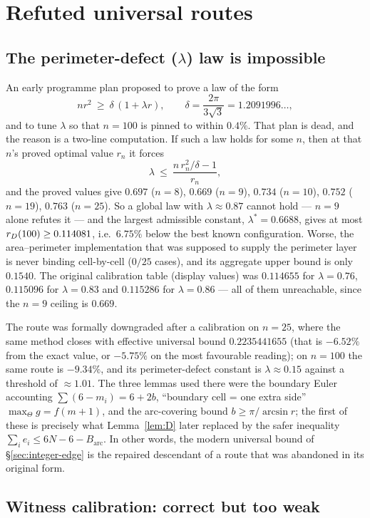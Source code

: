 \section{Refuted universal routes}

\subsection{The perimeter-defect ($\lambda$) law is impossible}

An early programme plan proposed to prove a law of the form
\[
n r^2\ \ge\ \delta\,(1+\lambda r),\qquad \delta=\frac{2\pi}{3\sqrt3}=1.2091996\ldots,
\]
and to tune $\lambda$ so that $n=100$ is pinned to within $0.4\%$. That plan is dead, and the
reason is a two-line computation. If such a law holds for some $n$, then at that $n$'s proved
optimal value $r_n$ it forces
\[
\lambda\ \le\ \frac{n\,r_n^2/\delta-1}{r_n},
\]
and the proved values give $0.697$ ($n=8$), $\mathbf{0.669}$ ($n=9$), $0.734$ ($n=10$), $0.752$
($n=19$), $0.763$ ($n=25$). So a global law with $\lambda\approx0.87$ cannot hold --- $n=9$ alone
refutes it --- and the largest admissible constant, $\lambda^\ast=0.6688$, gives at most
$r_{D}(100)\ge0.114081$, i.e.\ $6.75\%$ below the best known configuration. Worse, the
area--perimeter implementation that was supposed to supply the perimeter layer is never binding
cell-by-cell ($0/25$ cases), and its aggregate upper bound is only $0.1540$. The original
calibration table (display values) was $0.114655$ for $\lambda=0.76$, $0.115096$ for $\lambda=0.83$
and $0.115286$ for $\lambda=0.86$ --- all of them unreachable, since the $n=9$ ceiling is
$0.669$.

The route was formally downgraded after a calibration on $n=25$, where the same method closes with
effective universal bound $0.2235441655$ (that is $-6.52\%$ from the exact value, or $-5.75\%$ on
the most favourable reading); on $n=100$ the same route is $-9.34\%$, and its perimeter-defect
constant is $\lambda\approx0.15$ against a threshold of $\approx1.01$. The three lemmas used there
were the boundary Euler accounting $\sum(6-m_i)=6+2b$, ``boundary cell = one extra side''
$\max_\Theta g=f(m+1)$, and the arc-covering bound $b\ge\pi/\arcsin r$; the first of these is
precisely what Lemma~\ref{lem:D} later replaced by the safer inequality
$\sum_ie_i\le6N-6-B_{\mathrm{arc}}$. In other words, the modern universal bound of
\S\ref{sec:integer-edge} is the repaired descendant of a route that was abandoned in its original
form.

\subsection{Witness calibration: correct but too weak}


